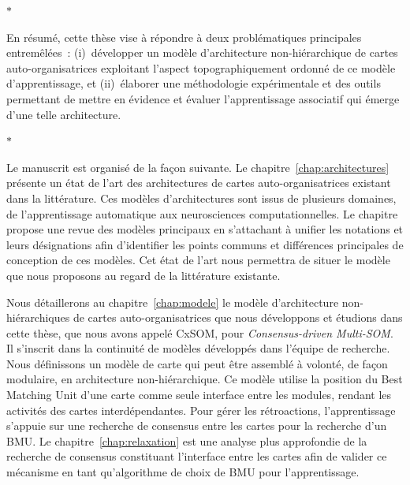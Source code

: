 \begin{center}
  $\ast$
\end{center}

En résumé, cette thèse vise à répondre à deux problématiques principales entremêlées~: (i)~développer un modèle d'architecture non-hiérarchique de cartes auto-organisatrices exploitant l'aspect topographiquement ordonné de ce modèle d'apprentissage, et (ii)~élaborer une méthodologie expérimentale et des outils permettant de mettre en évidence et évaluer l'apprentissage associatif qui émerge d'une telle architecture.

\begin{center}
  $\ast$
\end{center}

Le manuscrit est organisé de la façon suivante.
Le chapitre~\ref{chap:architectures} présente un état de l'art des architectures de cartes auto-organisatrices existant dans la littérature. Ces modèles d'architectures sont issus de plusieurs domaines, de l'apprentissage automatique aux neurosciences computationnelles.
Le chapitre propose une revue des modèles principaux en s'attachant à unifier les notations et leurs désignations afin d'identifier les points communs et différences principales de conception de ces modèles.
Cet état de l'art nous permettra de situer le modèle que nous proposons au regard de la littérature existante.

Nous détaillerons au chapitre~\ref{chap:modele} le modèle d'architecture non-hiérarchiques de cartes auto-organisatrices que nous développons et étudions dans cette thèse, que nous avons appelé CxSOM, pour \emph{Consensus-driven Multi-SOM}. Il s'inscrit dans la continuité de modèles développés dans l'équipe de recherche.
Nous définissons un modèle de carte qui peut être assemblé à volonté, de façon modulaire, en architecture non-hiérarchique. Ce modèle utilise la position du Best Matching Unit d'une carte comme seule interface entre les modules, rendant les activités des cartes interdépendantes. Pour gérer les rétroactions, l'apprentissage s'appuie sur une recherche de consensus entre les cartes pour la recherche d'un BMU.
Le chapitre~\ref{chap:relaxation} est une analyse plus approfondie de la recherche de consensus constituant l'interface entre les cartes afin de valider ce mécanisme en tant qu'algorithme de choix de BMU pour l'apprentissage.

